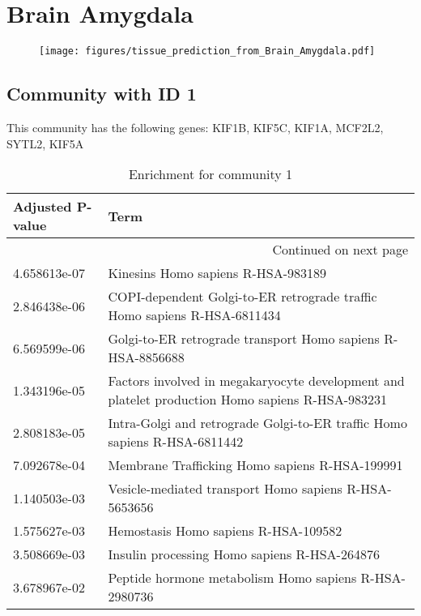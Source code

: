 
\section*{Brain Amygdala}
\begin{figure}[h!]
\centering
\texttt{[image: figures/tissue\_prediction\_from\_Brain\_Amygdala.pdf]}
\end{figure}



\subsection*{Community with ID 1}
This community has the following genes: KIF1B, KIF5C, KIF1A, MCF2L2, SYTL2, KIF5A
\\
\begin{longtable}{p{2.4cm}p{14.5cm}}
\caption{Enrichment for community 1}\\
\toprule
Adjusted \newline P-value &                                                                                             Term \\
\midrule
\endhead
\midrule
\multicolumn{2}{r}{{Continued on next page}} \\
\midrule
\endfoot

\bottomrule
\endlastfoot
             4.658613e-07 &                                                               Kinesins Homo sapiens R-HSA-983189 \\
             2.846438e-06 &                         COPI-dependent Golgi-to-ER retrograde traffic Homo sapiens R-HSA-6811434 \\
             6.569599e-06 &                                      Golgi-to-ER retrograde transport Homo sapiens R-HSA-8856688 \\
             1.343196e-05 &  Factors involved in megakaryocyte development and platelet production Homo sapiens R-HSA-983231 \\
             2.808183e-05 &                        Intra-Golgi and retrograde Golgi-to-ER traffic Homo sapiens R-HSA-6811442 \\
             7.092678e-04 &                                                   Membrane Trafficking Homo sapiens R-HSA-199991 \\
             1.140503e-03 &                                            Vesicle-mediated transport Homo sapiens R-HSA-5653656 \\
             1.575627e-03 &                                                             Hemostasis Homo sapiens R-HSA-109582 \\
             3.508669e-03 &                                                     Insulin processing Homo sapiens R-HSA-264876 \\
             3.678967e-02 &                                            Peptide hormone metabolism Homo sapiens R-HSA-2980736 \\
\end{longtable}


